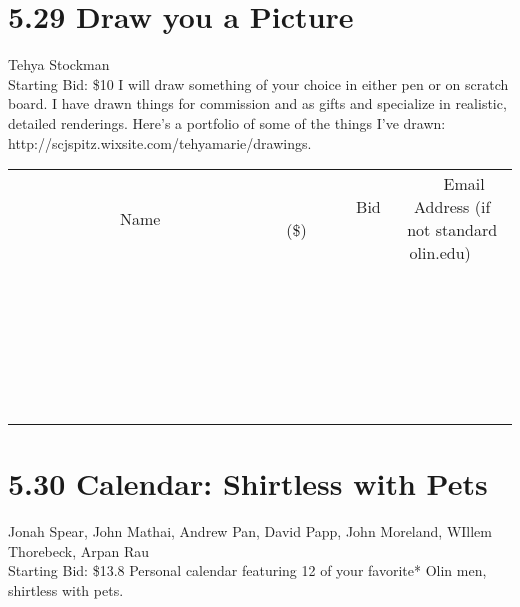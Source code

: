 \documentclass[11pt]{article}
\begin{document}
\section*{5.29 Draw you a Picture}
Tehya Stockman
\\
Starting Bid: \$10
\newline
I will draw something of your choice in either pen or on scratch board. I have drawn things for commission and as gifts  and specialize in realistic, detailed renderings. Here's a portfolio of some of the things I've drawn: http://scjspitz.wixsite.com/tehyamarie/drawings.
\\[6ex]
\begin{tabular}{c c c}
~~~~~~~~~~~~~Name~~~~~~~~~~~~~ & ~~~~~~~~~Bid (\$)~~~~~~~~~  & ~~~Email Address (if not standard olin.edu)~~~\\
 & & \\
\hline
 & & \\
\hline
 & & \\
\hline
 & & \\
\hline
 & & \\
\hline
 & & \\
\hline
 & & \\
\hline
 & & \\
\hline
 & & \\
\hline
 & & \\
\hline
 & & \\
\hline
 & & \\
\hline
 & & \\
\hline
 & & \\
\hline
 & & \\
\hline
 & & \\
\hline
 & & \\
\hline
 & & \\
\hline
 & & \\
\hline
 & & \\
\hline
 & & \\
\hline
 & & \\
\hline
 & & \\
\hline
 & & \\
\hline
 & & \\
\hline
 & & \\
\hline
\end{tabular}
\newpage
\section*{5.30 Calendar: Shirtless with Pets}
Jonah Spear, John Mathai, Andrew Pan, David Papp, John Moreland, WIllem Thorebeck, Arpan Rau
\\
Starting Bid: \$13.8
\newline
Personal calendar featuring 12 of your favorite* Olin men, shirtless with pets.
\end{document}
